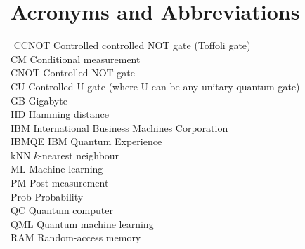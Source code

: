 \section*{Acronyms and Abbreviations}
\begin{tabbing}
 \hspace*{1.6cm}  \= \kill
 CCNOT \> Controlled controlled NOT gate (Toffoli gate) \\[0.5ex]
 CM \> Conditional measurement \\[0.5ex]
 CNOT \> Controlled NOT gate \\[0.5ex]
 CU \> Controlled U gate (where U can be any unitary quantum gate) \\[0.5ex]
 GB \> Gigabyte \\[0.5ex]
 HD \> Hamming distance \\[0.5ex]
 IBM \> International Business Machines Corporation \\[0.5ex]
 IBMQE \> IBM Quantum Experience \\[0.5ex]
 kNN \> $k$-nearest neighbour \\[0.5ex]
 ML \> Machine learning \\[0.5ex]
 PM \> Post-measurement \\[0.5ex]
 Prob \> Probability \\[0.5ex]
 QC \> Quantum computer \\[0.5ex]
 QML \> Quantum machine learning \\[0.5ex]
 RAM \> Random-access memory \\[0.5ex]
 
\end{tabbing}

 \cleardoublepage

